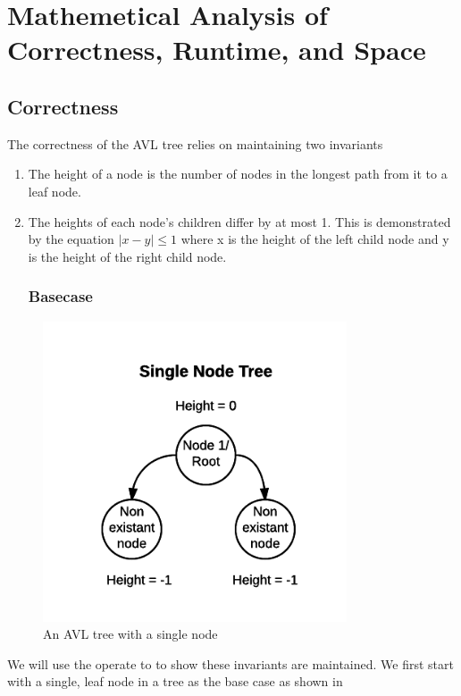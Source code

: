 \documentclass[12pt]{article}
\begin{document}
\section*{Mathemetical Analysis of Correctness, Runtime, and Space}

\subsection*{Correctness}
The correctness of the AVL tree relies on maintaining two invariants
\begin{enumerate}
  \item The height of a node is the number of nodes in the longest path from it
  to a leaf node.
  \item The heights of each node's children differ by at most 1.  This is
  demonstrated by the equation $|x-y| \le 1$ where x is the height of the left
  child node and y is the height of the right child node.
\subsubsection*{Basecase}
\end{enumerate}
\begin{figure}[h]
\caption{An AVL tree with a single node}
\includegraphics[width=9cm]{single_node_tree.png}
\centering
\end{figure}
\noindent
We will use the operate to to show these invariants are maintained.  We
first start with a single, leaf node in a tree as the base case as shown in
\end{document}
